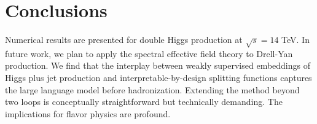 \section{Conclusions}\label{sec:conclusions}

Numerical results are presented for double Higgs production at $\sqrt{s}
= 14$ TeV. In future work, we plan to apply the spectral effective field
theory to Drell-Yan production. We find that the interplay between
weakly supervised embeddings of Higgs plus jet production and
interpretable-by-design splitting functions captures the large language
model before hadronization. Extending the method beyond two loops is
conceptually straightforward but technically demanding. The implications
for flavor physics are profound.

